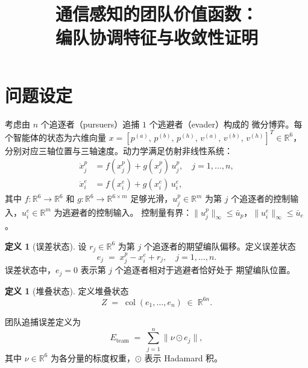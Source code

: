 \documentclass[a4paper,11pt]{article}
\title{\textbf{通信感知的团队价值函数：\\编队协调特征与收敛性证明}}
\author{}
\date{}
\theoremstyle{plain}
\theoremstyle{definition}
\newtheorem{definition}[theorem]{定义}
\theoremstyle{remark}
\DeclareMathOperator{\col}{col}
\newcommand{\R}{\mathbb{R}}
\newcommand{\norm}[1]{\lVert #1 \rVert}
\begin{document}
\maketitle

\section{问题设定}\label{sec:problem}

考虑由 $n$ 个追逐者（pursuers）追捕 $1$ 个逃避者（evader）构成的
微分博弈。每个智能体的状态为六维向量
$x = [p^{(a)},\, p^{(b)},\, p^{(h)},\, v^{(a)},\, v^{(b)},\, v^{(h)}]^T \in \R^6$，
分别对应三轴位置与三轴速度。动力学满足仿射非线性系统：
\begin{align}
  \dot{x}_j^p &= f(x_j^p) + g(x_j^p)\, u_j^p, \quad j = 1,\dots,n, \label{eq:dyn_p}\\
  \dot{x}_i^e &= f(x_i^e) + g(x_i^e)\, u_i^e, \label{eq:dyn_e}
\end{align}
其中 $f:\R^6\to\R^6$ 和 $g:\R^6\to\R^{6\times m}$ 足够光滑，$u_j^p\in\R^m$
为第 $j$ 个追逐者的控制输入，$u_i^e\in\R^m$ 为逃避者的控制输入。
控制量有界：$\norm{u_j^p}_\infty \le \bar{u}_p$，$\norm{u_i^e}_\infty \le \bar{u}_e$。

\begin{definition}[误差状态]\label{def:error}
  设 $r_j \in \R^6$ 为第 $j$ 个追逐者的期望编队偏移。定义误差状态
  \begin{equation}\label{eq:error}
    e_j \;=\; x_j^p - x_i^e + r_j, \quad j = 1,\dots,n.
  \end{equation}
  误差状态中，$e_j = 0$ 表示第 $j$ 个追逐者相对于逃避者恰好处于
  期望编队位置。
\end{definition}

\begin{definition}[堆叠状态]\label{def:stacked}
  定义堆叠状态
  \begin{equation}\label{eq:stacked}
    Z \;=\; \col(e_1, \dots, e_n) \;\in\; \R^{6n}.
  \end{equation}
\end{definition}

团队追捕误差定义为
\begin{equation}\label{eq:team_error}
  E_{\text{team}} \;=\; \sum_{j=1}^{n} \norm{\nu \odot e_j},
\end{equation}
其中 $\nu \in \R^6$ 为各分量的标度权重，$\odot$ 表示 Hadamard 积。
\end{document}
